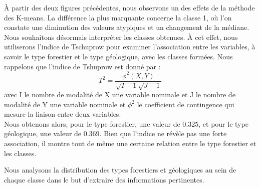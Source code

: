 \documentclass{article}
\begin{document}
À partir des deux figures précédentes, nous observons un des effets de la méthode des K-means. La différence la plus marquante concerne la classe 1, où l'on constate une diminution des valeurs atypiques et un changement de la médiane.\\
Nous souhaitons désormais interpréter les classes obtenues. À cet effet, nous utiliserons l'indice de Tschuprow pour examiner l'association entre les variables, à savoir le type forestier et le type géologique, avec les classes formées.
Nous rappelons que l'indice de Tshuprow est donné par : 
\[
T^2 = \frac{\phi^2 (X,Y)}{\sqrt{I-1}\sqrt{J-1}} 
\]
avec I le nombre de modalité de X une variable nominale et J le nombre de modalité de Y une variable nominale et $\phi^2$ le coefficient de contingence qui mesure la liaison entre deux variables. 
\\
Nous obtenons alors, pour le type forestier, une valeur de $0.325$, et pour le type géologique, une valeur de $0.369$.  
Bien que l'indice ne révèle pas une forte association, il montre tout de même une certaine relation entre le type forestier et les classes.

Nous analysons la distribution des types forestiers et géologiques au sein de chaque classe dans le but d'extraire des informations pertinentes.
\end{document}
